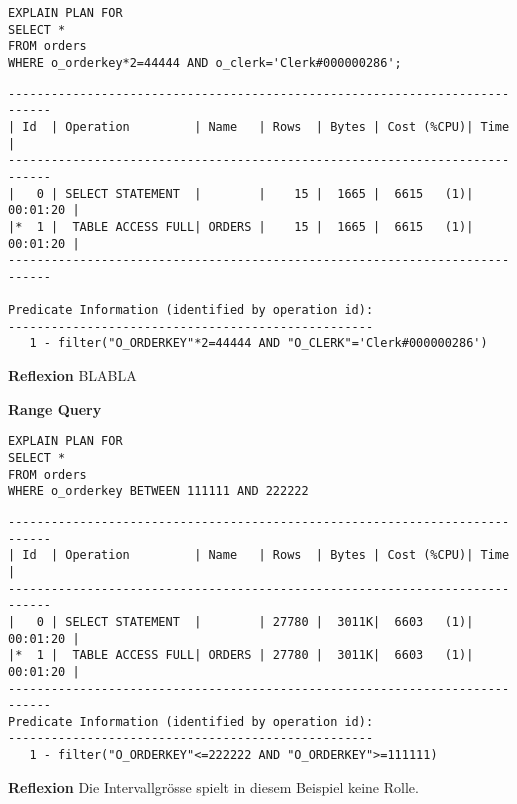 \documentclass[10pt]{article}
\begin{document}
\begin{lstlisting}[style=sql]
EXPLAIN PLAN FOR 
SELECT *
FROM orders
WHERE o_orderkey*2=44444 AND o_clerk='Clerk#000000286';
\end{lstlisting}
\begin{lstlisting}[style=queryexecutionplan]
----------------------------------------------------------------------------
| Id  | Operation         | Name   | Rows  | Bytes | Cost (%CPU)| Time     |
----------------------------------------------------------------------------
|   0 | SELECT STATEMENT  |        |    15 |  1665 |  6615   (1)| 00:01:20 |
|*  1 |  TABLE ACCESS FULL| ORDERS |    15 |  1665 |  6615   (1)| 00:01:20 |
----------------------------------------------------------------------------
 
Predicate Information (identified by operation id):
---------------------------------------------------
   1 - filter("O_ORDERKEY"*2=44444 AND "O_CLERK"='Clerk#000000286')
\end{lstlisting}
\textbf{Reflexion} \newline
BLABLA

\textbf{Range Query}
\begin{lstlisting}[style=sqlNoTitle]
EXPLAIN PLAN FOR
SELECT *
FROM orders
WHERE o_orderkey BETWEEN 111111 AND 222222
\end{lstlisting}
\begin{lstlisting}[style=queryexecutionplan]
----------------------------------------------------------------------------
| Id  | Operation         | Name   | Rows  | Bytes | Cost (%CPU)| Time     |
----------------------------------------------------------------------------
|   0 | SELECT STATEMENT  |        | 27780 |  3011K|  6603   (1)| 00:01:20 |
|*  1 |  TABLE ACCESS FULL| ORDERS | 27780 |  3011K|  6603   (1)| 00:01:20 |
----------------------------------------------------------------------------
Predicate Information (identified by operation id):
---------------------------------------------------
   1 - filter("O_ORDERKEY"<=222222 AND "O_ORDERKEY">=111111)
\end{lstlisting}
\textbf{Reflexion} \newline
Die Intervallgrösse spielt in diesem Beispiel keine Rolle.
\end{document}
